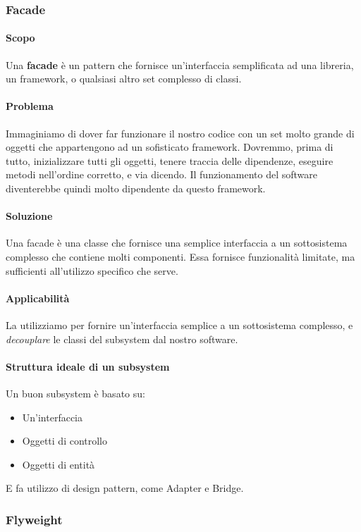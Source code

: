 \documentclass[11pt]{article}
\begin{document}
\subsubsection{Facade}
\paragraph{Scopo}
Una \textbf{facade} è un pattern che fornisce un'interfaccia semplificata ad una libreria, un framework, o qualsiasi altro set complesso di classi.
\paragraph{Problema}
Immaginiamo di dover far funzionare il nostro codice con un set molto grande di oggetti che appartengono ad un sofisticato framework. Dovremmo, prima di tutto, inizializzare tutti gli oggetti, tenere traccia delle dipendenze, eseguire metodi nell'ordine corretto, e via dicendo. Il funzionamento del software diventerebbe quindi molto dipendente da questo framework.
\paragraph{Soluzione}
Una facade è una classe che fornisce una semplice interfaccia a un sottosistema complesso che contiene molti componenti. Essa fornisce funzionalità limitate, ma sufficienti all'utilizzo specifico che serve. 
\paragraph{Applicabilità}
La utilizziamo per fornire un'interfaccia semplice a un sottosistema complesso, e \textit{decouplare} le classi del subsystem dal nostro software.
\paragraph{Struttura ideale di un subsystem}
Un buon subsystem è basato su:
\begin{itemize}
    \item Un'interfaccia
    \item Oggetti di controllo
    \item Oggetti di entità
\end{itemize}
E fa utilizzo di design pattern, come Adapter e Bridge.

\subsubsection{Flyweight}
\end{document}
